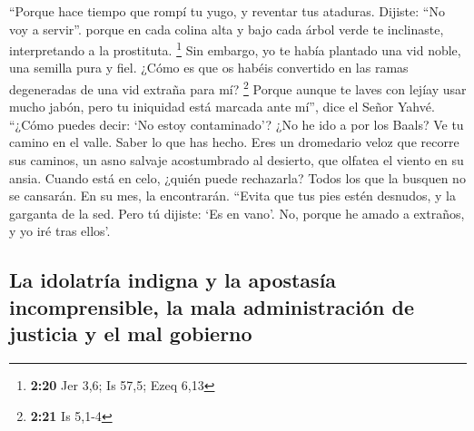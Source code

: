  ``Porque hace tiempo que rompí tu yugo, y reventar tus
ataduras. Dijiste: ``No voy a servir''. porque en cada colina alta y
bajo cada árbol verde te inclinaste, interpretando a la prostituta.
\footnote{\textbf{2:20} Jer 3,6; Is 57,5; Ezeq 6,13}  Sin
embargo, yo te había plantado una vid noble, una semilla pura y fiel.
¿Cómo es que os habéis convertido en las ramas degeneradas de una vid
extraña para mí? \footnote{\textbf{2:21} Is 5,1-4} 
Porque aunque te laves con lejíay usar mucho jabón, pero tu iniquidad
está marcada ante mí'', dice el Señor Yahvé.  ``¿Cómo
puedes decir: `No estoy contaminado'? ¿No he ido a por los Baals? Ve tu
camino en el valle. Saber lo que has hecho. Eres un dromedario veloz que
recorre sus caminos,  un asno salvaje acostumbrado al
desierto, que olfatea el viento en su ansia. Cuando está en celo, ¿quién
puede rechazarla? Todos los que la busquen no se cansarán. En su mes, la
encontrarán.  ``Evita que tus pies estén desnudos, y la
garganta de la sed. Pero tú dijiste: `Es en vano'. No, porque he amado a
extraños, y yo iré tras ellos'.

\hypertarget{la-idolatruxeda-indigna-y-la-apostasuxeda-incomprensible-la-mala-administraciuxf3n-de-justicia-y-el-mal-gobierno}{%
\subsection{La idolatría indigna y la apostasía incomprensible, la mala
administración de justicia y el mal
gobierno}\label{la-idolatruxeda-indigna-y-la-apostasuxeda-incomprensible-la-mala-administraciuxf3n-de-justicia-y-el-mal-gobierno}}

